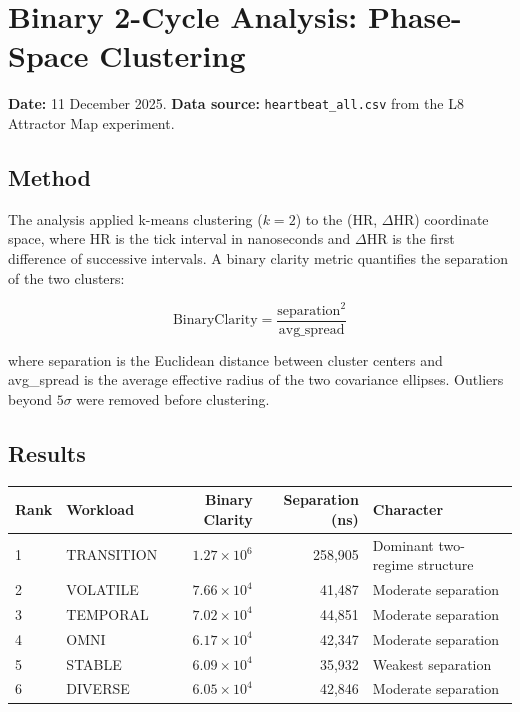 
\section{Binary 2-Cycle Analysis: Phase-Space Clustering}

\textbf{Date:} 11 December 2025. \textbf{Data source:}
\texttt{heartbeat\_all.csv} from the L8 Attractor Map experiment.

\subsection{Method}

The analysis applied k-means clustering ($k = 2$) to the (HR, $\Delta$HR)
coordinate space, where HR is the tick interval in nanoseconds and
$\Delta$HR is the first difference of successive intervals. A binary
clarity metric quantifies the separation of the two clusters:

\[
  \text{BinaryClarity} = \frac{\text{separation}^2}{\text{avg\_spread}}
\]

where separation is the Euclidean distance between cluster centers and
avg\_spread is the average effective radius of the two covariance ellipses.
Outliers beyond $5\sigma$ were removed before clustering.

\subsection{Results}

\begin{center}
\begin{tabular}{llrrl}
\toprule
Rank & Workload   & Binary Clarity & Separation (ns) & Character \\
\midrule
1 & TRANSITION & $1.27 \times 10^6$ & 258{,}905 & Dominant two-regime structure \\
2 & VOLATILE   & $7.66 \times 10^4$ & 41{,}487  & Moderate separation \\
3 & TEMPORAL   & $7.02 \times 10^4$ & 44{,}851  & Moderate separation \\
4 & OMNI       & $6.17 \times 10^4$ & 42{,}347  & Moderate separation \\
5 & STABLE     & $6.09 \times 10^4$ & 35{,}932  & Weakest separation \\
6 & DIVERSE    & $6.05 \times 10^4$ & 42{,}846  & Moderate separation \\
\bottomrule
\end{tabular}
\end{center}

